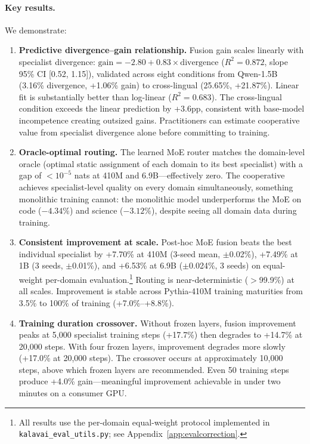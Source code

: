 \documentclass{article}
\begin{document}
\paragraph{Key results.} We demonstrate:
\begin{enumerate}[leftmargin=*, itemsep=2pt]
  \item \textbf{Predictive divergence--gain relationship.} Fusion gain scales linearly with specialist divergence: $\text{gain} = -2.80 + 0.83 \times \text{divergence}$ ($R^2 = 0.872$, slope 95\% CI [0.52, 1.15]), validated across eight conditions from Qwen-1.5B (3.16\% divergence, +1.06\% gain) to cross-lingual (25.65\%, +21.87\%). Linear fit is substantially better than log-linear ($R^2 = 0.683$). The cross-lingual condition exceeds the linear prediction by +3.6pp, consistent with base-model incompetence creating outsized gains. Practitioners can estimate cooperative value from specialist divergence alone before committing to training.
  \item \textbf{Oracle-optimal routing.} The learned MoE router matches the domain-level oracle (optimal static assignment of each domain to its best specialist) with a gap of $<10^{-5}$ nats at 410M and 6.9B---effectively zero. The cooperative achieves specialist-level quality on every domain simultaneously, something monolithic training cannot: the monolithic model underperforms the MoE on code ($-4.34\%$) and science ($-3.12\%$), despite seeing all domain data during training.
  \item \textbf{Consistent improvement at scale.} Post-hoc MoE fusion beats the best individual specialist by +7.70\% at 410M (3-seed mean, $\pm$0.02\%), +7.49\% at 1B (3 seeds, $\pm$0.01\%), and +6.53\% at 6.9B ($\pm$0.024\%, 3 seeds) on equal-weight per-domain evaluation.\footnote{All results use the per-domain equal-weight protocol implemented in \texttt{kalavai\_eval\_utils.py}; see Appendix~\ref{app:evalcorrection}.} Routing is near-deterministic ($>$99.9\%) at all scales. Improvement is stable across Pythia-410M training maturities from 3.5\% to 100\% of training (+7.0\%--+8.8\%).
  \item \textbf{Training duration crossover.} Without frozen layers, fusion improvement peaks at 5,000 specialist training steps (+17.7\%) then degrades to +14.7\% at 20,000 steps. With four frozen layers, improvement degrades more slowly (+17.0\% at 20,000 steps). The crossover occurs at approximately 10,000 steps, above which frozen layers are recommended. Even 50 training steps produce +4.0\% gain---meaningful improvement achievable in under two minutes on a consumer GPU.

\end{enumerate}
\end{document}
